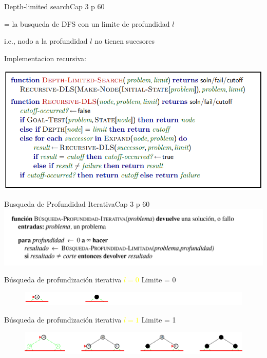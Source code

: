 \documentclass{beamer}
\theoremstyle{definition}
\theoremstyle{theorem}
\theoremstyle{remark}
\begin{document}
\begin{frame}{Depth-limited search}{Cap 3 p 60}
\begin{right}

= la busqueda de DFS con un limite de profundidad $l$

i.e., nodo a la profundidad $l$ no tienen sucesores

Implementacion recursiva:

\includegraphics[scale = 0.5]{dfs_limit.PNG}

\end{right}
\end{frame}

\begin{frame}{Busqueda de Profundidad Iterativa}{Cap 3 p 60}
    \includegraphics[scale = 0.35]{61_dfsIterativo.PNG}
\end{frame}

    \begin{frame}{Búsqueda de profundización iterativa \textcolor{Yellow}{$l=0$}}
        Limite = 0
        \begin{figure}\includegraphics[width =123mm]{62_IDS_l0.PNG}\end{figure}
    \end{frame}
    
\begin{frame}{Búsqueda de profundización iterativa \textcolor{Yellow}{$l=1$}}
    Limite = 1
    \begin{figure}\includegraphics[width =123mm]{63_IDS_l1.png}\end{figure}
\end{frame}
\end{document}
